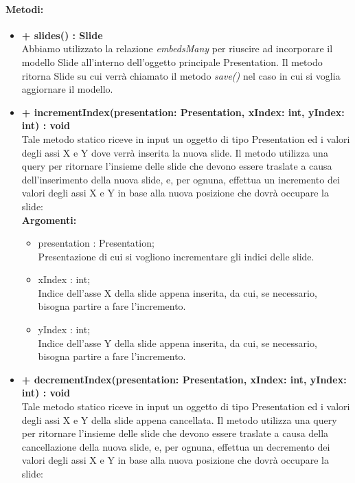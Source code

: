 	\paragraph{Metodi:}
	\begin{itemize}
		\item \textbf{+ slides() : Slide}\\
		Abbiamo utilizzato la relazione \textit{embedsMany} per riuscire ad incorporare il modello \gls{Slide} all’interno dell’oggetto principale Presentation. Il metodo ritorna \gls{Slide} su cui verrà chiamato il metodo \textit{save()} nel caso in cui si voglia aggiornare il modello.
		\item \textbf{+ incrementIndex(presentation: Presentation, xIndex: int, yIndex: int) : void}\\
		Tale metodo statico riceve in input un oggetto di tipo Presentation ed i valori degli assi X e Y dove verrà inserita la nuova \gls{slide}. Il metodo utilizza una query per ritornare l'insieme delle \gls{slide} che devono essere traslate a causa dell'inserimento della nuova \gls{slide}, e, per ognuna, effettua un incremento dei valori degli assi X e Y in base alla nuova posizione che dovrà occupare la \gls{slide}:\\
		\textbf{Argomenti:}
		\begin{itemize}
			\item presentation : Presentation;\\
			Presentazione di cui si vogliono incrementare gli indici delle \gls{slide}.
			\item xIndex : int;\\
			Indice dell'asse X della \gls{slide} appena inserita, da cui, se necessario, bisogna partire a fare l'incremento.
			\item yIndex : int;\\
			Indice dell'asse Y della \gls{slide} appena inserita, da cui, se necessario, bisogna partire a fare l'incremento.
		\end{itemize}
		\item \textbf{+ decrementIndex(presentation: Presentation, xIndex: int, yIndex: int) : void}\\
		Tale metodo statico riceve in input un oggetto di tipo Presentation ed i valori degli assi X e Y della \gls{slide} appena cancellata. Il metodo utilizza una query per ritornare l'insieme delle \gls{slide} che devono essere traslate a causa della cancellazione della nuova \gls{slide}, e, per ognuna, effettua un decremento dei valori degli assi X e Y in base alla nuova posizione che dovrà occupare la \gls{slide}:\\

\end{itemize}
